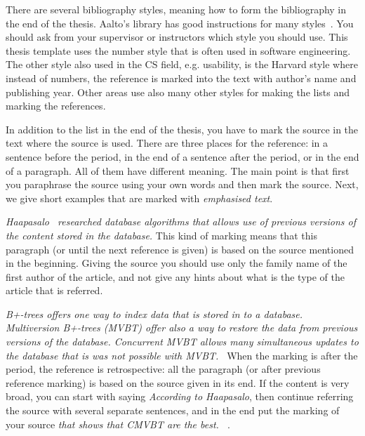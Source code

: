 \documentclass[12pt,a4paper,oneside,pdftex]{report}
\begin{document}
There are several bibliography styles, meaning how to form the
bibliography in the end of the thesis. Aalto's library has good
instructions for many styles~\cite{bibinstructions}. You should ask
from your supervisor or instructors which style you should use. This
thesis template uses the number style that is often used in software
engineering. The other style also used in the CS field,
e.g. usability, is the Harvard style where instead of numbers, the
reference is marked into the text with author's name and publishing
year. Other areas use also many other styles for making the lists and
marking the references.

In addition to the list in the end of the thesis, you have to mark the
source in the text where the source is used. There are three places
for the reference: in a sentence before the period, in the end of a
sentence after the period, or in the end of a paragraph. All of them
have different meaning. The main point is that first you paraphrase
the source using your own words and then mark the source. Next, we
give short examples that are marked with \emph{emphasised text}.

\emph{Haapasalo~\cite{HaapasaloThesis} researched database algorithms
  that allows use of previous versions of the content stored in the
  database.} This kind of marking means that this paragraph (or until
the next reference is given) is based on the source mentioned in the
beginning.  Giving the source you should use only the family name of
the first author of the article, and not give any hints about what is
the type of the article that is referred.

\emph{B+-trees offers one way to index data that is stored in to a
  database. Multiversion B+-trees (MVBT) offer also a way to restore
  the data from previous versions of the database. Concurrent MVBT
  allows many simultaneous updates to the database that is was not
  possible with MVBT.~\cite{HaapasaloThesis}} When the marking is
after the period, the reference is retrospective: all the paragraph
(or after previous reference marking) is based on the source given in
its end. If the content is very broad, you can start with saying
\emph{According to Haapasalo}, then continue referring the source with
several separate sentences, and in the end put the marking of your
source \emph{ that shows that CMVBT are the
  best. ~\cite{HaapasaloThesis}}.
\end{document}
